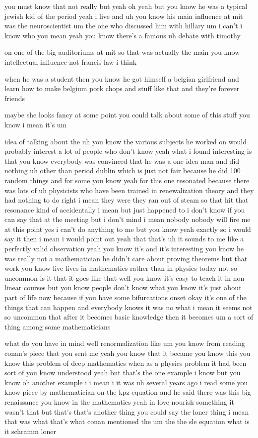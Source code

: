 \begin{description}
you must know that not really but yeah oh yeah but you know he was a typical jewish kid of the period yeah i live and uh you know his main influence at mit was the neuroscientist um the one who discussed him with hillary um i can't i know who you mean yeah you know there's a famous uh debate with timothy

on one of the big auditoriums at mit so that was actually the main you know intellectual influence not francis law i think

when he was a student then you know he got himself a belgian girlfriend and learn how to make belgium pork chops and stuff like that and they're forever friends

maybe she looks fancy at some point you could talk about some of this stuff you know i mean it's um

idea of talking about the uh you know the various subjects he worked on would probably interest a lot of people who don't know yeah what i found interesting is that you know everybody was convinced that he was a one idea man and did nothing uh other than period dublin which is just not fair because he did 100 random things and for some you know yeah for this one resonated because there was lots of uh physicists who have been trained in renewalization theory and they had nothing to do right i mean they were they ran out of steam so that hit that resonance kind of accidentally i mean but just happened to i don't know if you can say that at the meeting but i don't mind i mean nobody nobody will fire me at this point yes i can't do anything to me but you know yeah exactly so i would say it then i mean i would point out yeah that that's uh it sounds to me like a perfectly valid observation yeah you know it's and it's interesting you know he was really not a mathematician he didn't care about proving theorems but that work you know live lives in mathematics rather than in physics today not so uncommon is it that it goes like that well you know it's easy to teach it in non-linear courses but you know people don't know what you know it's just about part of life now because if you have some bifurcations onset okay it's one of the things that can happen and everybody knows it was no what i mean it seems not so uncommon that after it becomes basic knowledge then it becomes um a sort of thing among some mathematicians

what do you have in mind well renormalization like um you know from reading conan's piece that you sent me yeah you know that it became you know this you know this problem of deep mathematics when as a physics problem it had been sort of you know understood yeah but that's the one example i know but you know oh another example i i mean i it was uh several years ago i read some you know piece by mathematician on the kpz equation and he said there was this big renaissance you know in the mathematics yeah in love nourish something it wasn't that but that's that's another thing you could say the loner thing i mean that was what that's what conan mentioned the um the the sle equation what is it schramm loner


\end{description}
